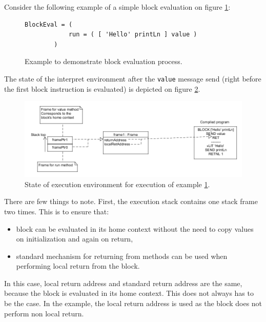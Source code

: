 \documentclass[thesis=M,english]{FITthesis}[2019/12/23]
\begin{document}
Consider the following example of a simple block evaluation on figure \ref{fig:block_eval_1}:
\begin{figure}[h!]
	\centering
	\begin{lstlisting}[language=Smalltalk]
		BlockEval = (
			run = ( [ 'Hello' printLn ] value )
		)
	\end{lstlisting}
	\caption{Example to demonstrate block evaluation process.}
	\label{fig:block_eval_1}
\end{figure}

The state of the interpret environment after the \texttt{value} message send (right before the first block instruction is evaluated) is depicted 
on figure \ref{fig:block_eval_1_diagram}.

\begin{figure}
	\centering
	\includegraphics[width=\textwidth]{media/block_exec_1.png}
	\caption{State of execution environment for execution of example \ref{fig:block_eval_1}.}
	\label{fig:block_eval_1_diagram}
\end{figure}

There are few things to note. First, the execution stack contains one stack frame two times. This is to ensure that:
\begin{itemize}
	\item block can be evaluated in its home context without the need to copy values on initialization and again on return,
	\item standard mechanism for returning from methods can be used when performing local return from the block.
\end{itemize}

In this case, local return address and standard return address are the same, because the block is evaluated in its home context.
This does not always has to be the case. In the example, the local return address is used as the block does not perform non local
return.
\end{document}
